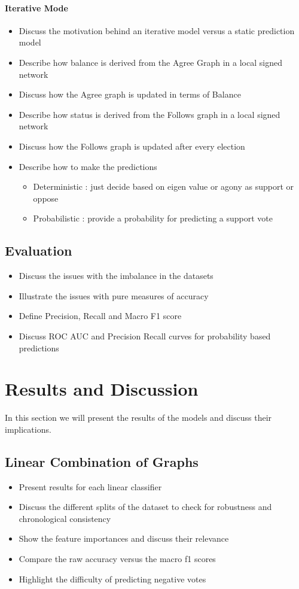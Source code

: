 \subsubsection{Iterative Mode}
\begin{itemize}
    \item Discuss the motivation behind an iterative model versus a static prediction model
    \item Describe how balance is derived from the Agree Graph in a local signed network
    \item Discuss how the Agree graph is updated in terms of Balance
    \item Describe how status is derived from the Follows graph in a local signed network 
    \item Discuss how the Follows graph is updated after every election
    \item Describe how to make the predictions 
    \begin{itemize}
        \item Deterministic : just decide based on eigen value or agony as support or oppose
        \item Probabilistic : provide a probability for predicting a support vote
    \end{itemize}
\end{itemize}
\section{Evaluation}
\begin{itemize}
    \item Discuss the issues with the imbalance in the datasets
    \item Illustrate the issues with pure measures of accuracy
    \item Define Precision, Recall and Macro F1 score
    \item Discuss ROC AUC and Precision Recall curves for probability based predictions 
\end{itemize}

\chapter{Results and Discussion} 
\label{chp:results}
In this section we will present the results of the models and discuss their implications.
\section{Linear Combination of Graphs}
\begin{itemize}
    \item Present results for each linear classifier
    \item Discuss the different splits of the dataset to check for robustness and chronological consistency
    \item Show the feature importances and discuss their relevance 
    \item Compare the raw accuracy versus the macro f1 scores
    \item Highlight the difficulty of predicting negative votes
\end{itemize}
